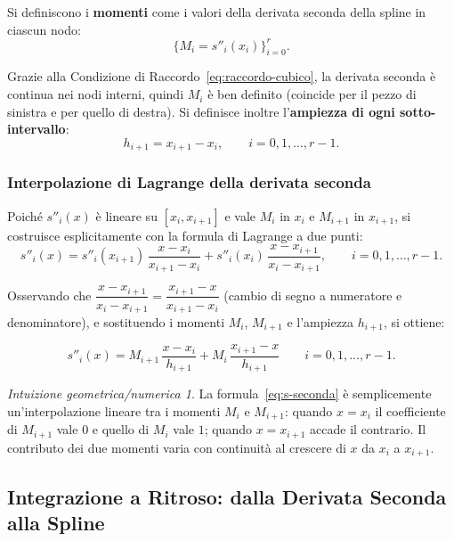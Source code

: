 \documentclass[a4paper,12pt]{article}
\theoremstyle{definition}
\theoremstyle{remark}
\newtheorem*{intuizione}{Intuizione geometrica/numerica}
\begin{document}
Si definiscono i \textbf{momenti} come i valori della derivata seconda
della spline in ciascun nodo:
\[
  \{M_i = s''_i(x_i)\}_{i=0}^{r}.
\]

Grazie alla Condizione di Raccordo~\eqref{eq:raccordo-cubico}, la derivata
seconda è continua nei nodi interni, quindi $M_i$ è ben definito (coincide
per il pezzo di sinistra e per quello di destra). Si definisce inoltre
l'\textbf{ampiezza di ogni sotto-intervallo}:
\[
  h_{i+1} = x_{i+1} - x_i, \qquad i = 0, 1, \ldots, r-1.
\]

\subsubsection*{Interpolazione di Lagrange della derivata seconda}

Poiché $s''_i(x)$ è lineare su $[x_i, x_{i+1}]$ e vale $M_i$ in $x_i$
e $M_{i+1}$ in $x_{i+1}$, si costruisce esplicitamente con la formula di
Lagrange a due punti:
\[
  s''_i(x)
  = s''_i(x_{i+1})\,\frac{x - x_i}{x_{i+1} - x_i}
  + s''_i(x_i)\,\frac{x - x_{i+1}}{x_i - x_{i+1}},
  \qquad i = 0, 1, \ldots, r-1.
\]

Osservando che $\dfrac{x - x_{i+1}}{x_i - x_{i+1}} = \dfrac{x_{i+1} - x}{x_{i+1} - x_i}$
(cambio di segno a numeratore e denominatore), e sostituendo i momenti
$M_i$, $M_{i+1}$ e l'ampiezza $h_{i+1}$, si ottiene:

\begin{equation}
  \boxed{
    s''_i(x) = M_{i+1}\,\frac{x - x_i}{h_{i+1}}
              + M_i\,\frac{x_{i+1} - x}{h_{i+1}}
  }
  \qquad i = 0, 1, \ldots, r-1.
  \label{eq:s-seconda}
\end{equation}

\begin{intuizione}
La formula~\eqref{eq:s-seconda} è semplicemente un'interpolazione lineare
tra i momenti $M_i$ e $M_{i+1}$: quando $x = x_i$ il coefficiente di
$M_{i+1}$ vale $0$ e quello di $M_i$ vale $1$; quando $x = x_{i+1}$
accade il contrario. Il contributo dei due momenti varia con continuità
al crescere di $x$ da $x_i$ a $x_{i+1}$.
\end{intuizione}

\subsection{Integrazione a Ritroso: dalla Derivata Seconda alla Spline}
\end{document}
